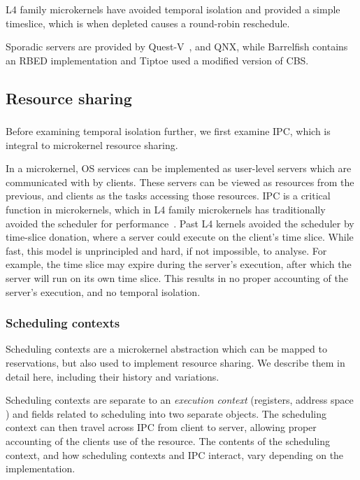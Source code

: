 L4 family microkernels have avoided temporal isolation and provided a simple timeslice, which is
when depleted causes a round-robin reschedule.

Sporadic servers are provided by
Quest-V~\citep{Li_WCM_14}, and QNX, while Barrelfish contains an \gls{RBED} implementation and
Tiptoe used a modified version of \gls{CBS}. 

\subsection{Resource sharing}

\subsubsection{}

Before examining temporal isolation further, we first examine \gls{IPC}, which is integral to 
microkernel resource sharing. 

In a microkernel, \gls{OS} services can be implemented as user-level servers which are communicated
with by clients. These servers can be viewed as resources from the previous, and clients as the
tasks accessing those resources. \gls{IPC} is a critical function in microkernels, which in L4
family microkernels has traditionally avoided the scheduler for
performance~\citep{Heiser_Elphinstone_16}. Past L4 kernels avoided the scheduler by time-slice
donation, where a server could execute on the client's time slice. While fast, this model is
unprincipled and hard, if not impossible, to analyse. For example, the time slice may expire during
the server's execution, after which the server will run on its own time slice.  This results in no
proper accounting of the server's execution, and no temporal isolation.

\subsubsection{Scheduling contexts}

Scheduling contexts are a microkernel abstraction which can be mapped to reservations, but also used
to implement resource sharing. We describe them in detail here, including their history and
variations.  

Scheduling contexts are separate to an \emph{execution
context} (registers, address space \etc) and fields related to scheduling into two separate objects.
The scheduling context can then travel across \gls{IPC} from client to server, allowing proper
accounting of the clients use of the resource. The contents of the scheduling context, and how 
scheduling contexts and \gls{IPC} interact, vary depending on the implementation.  

